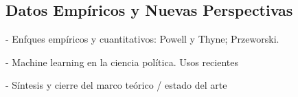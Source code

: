\documentclass{article}
\begin{document}
\subsection{Datos Empíricos y Nuevas Perspectivas}

- Enfques empíricos y cuantitativos: Powell y Thyne; Przeworski.

- Machine learning en la ciencia política. Usos recientes





- Síntesis y cierre del marco teórico / estado del arte


\end{document}
